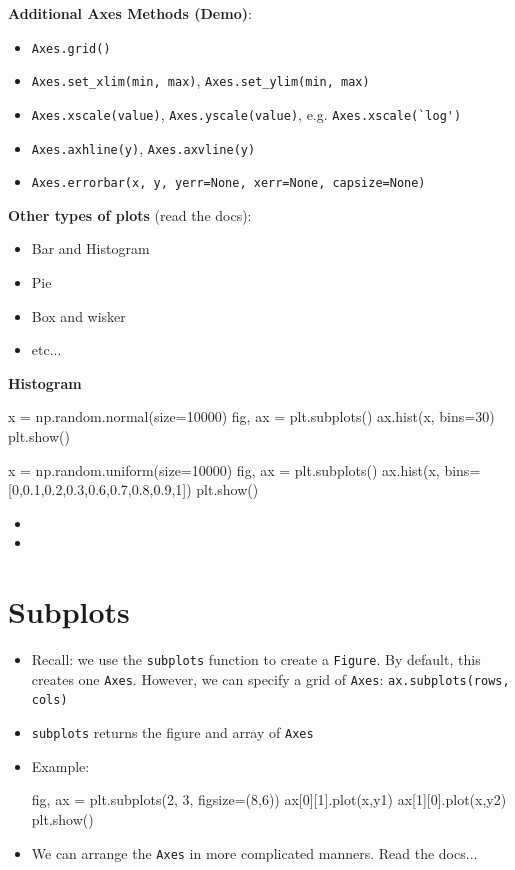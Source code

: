 \documentclass[12pt]{article}
\numberwithin{equation}{section}
\begin{document}
\textbf{Additional Axes Methods (Demo)}:
\begin{itemize}
    \item \verb|Axes.grid()|
    \item \verb|Axes.set_xlim(min, max)|, \verb|Axes.set_ylim(min, max)|
    \item \verb|Axes.xscale(value)|, \verb|Axes.yscale(value)|, e.g. \verb|Axes.xscale(`log')|
    \item \verb|Axes.axhline(y)|, \verb|Axes.axvline(y)|
    \item \verb|Axes.errorbar(x, y, yerr=None, xerr=None, capsize=None)|
\end{itemize}

\textbf{Other types of plots} (read the docs):
\begin{itemize}
    \item Bar and Histogram
    \item Pie 
    \item Box and wisker
    \item etc...
\end{itemize}

\textbf{Histogram}
\begin{python}
x = np.random.normal(size=10000)
fig, ax = plt.subplots()
ax.hist(x, bins=30)
plt.show()
\end{python}
\begin{python}
x = np.random.uniform(size=10000)
fig, ax = plt.subplots()
ax.hist(x, bins=[0,0.1,0.2,0.3,0.6,0.7,0.8,0.9,1])
plt.show()
\end{python}
\begin{itemize}
	\item 
	\item
\end{itemize}

\section{Subplots}
\begin{itemize}
    \item Recall: we use the \verb|subplots| function to create a \verb|Figure|. By default, this creates one \verb|Axes|. However, we can specify a grid of \verb|Axes|: \verb|ax.subplots(rows, cols)|
    \item \verb|subplots| returns the figure and array of \verb|Axes|
    \item Example:
    \begin{python}
    fig, ax = plt.subplots(2, 3, figsize=(8,6))
    ax[0][1].plot(x,y1)
    ax[1][0].plot(x,y2)
    plt.show()
    \end{python}
    \item We can arrange the \verb|Axes| in more complicated manners. Read the docs...
\end{itemize}
\end{document}
